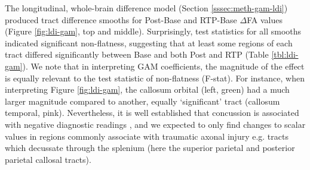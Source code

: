 \documentclass[12pt]{article}
\begin{document}
The longitudinal, whole-brain difference model (Section \ref{sssec:meth-gam-ldi}) produced tract difference smooths for Post-Base and RTP-Base $\Delta$FA values (Figure \ref{fig:ldi-gam}, top and middle). Surprisingly, test statistics for all smooths indicated significant non-flatness, suggesting that at least some regions of each tract differed significantly between Base and both Post and RTP (Table \ref{tbl:ldi-gam}). We note that in interpreting GAM coefficients, the magnitude of the effect is equally relevant to the test statistic of non-flatness (F-stat). For instance, when interpreting Figure \ref{fig:ldi-gam}, the callosum orbital (left, green) had a much larger magnitude compared to another, equally `significant' tract (callosum temporal, pink). Nevertheless, it is well established that concussion is associated with negative diagnostic readings \parencite[e.g.][]{klein2019PrevalencePotentiallyClinically}, and we expected to only find changes to scalar values in regions commonly associate with traumatic axonal injury e.g. tracts which decussate through the splenium (here the superior parietal and posterior parietal callosal tracts).
\end{document}
